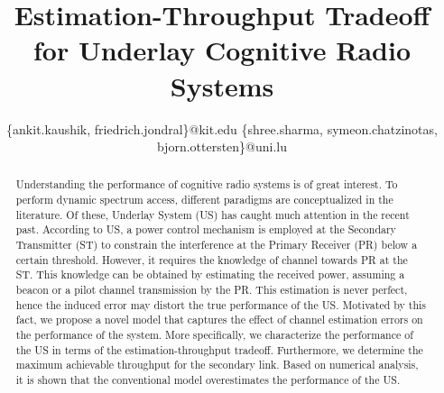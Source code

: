 \documentclass[conference, twocolumn]{IEEEtran}
\newcommand{\imp}{\uline}
\newcommand{\ur}{\uuline}
\newcommand{\ns}{\uwave}
\newcommand{\ws}{\sout}
\newcommand{\fl}{\dashuline}
\newcommand{\un}{\dotuline}
\begin{document}
%
\title{Estimation-Throughput Tradeoff for Underlay Cognitive Radio Systems}
\author{
\{ankit.kaushik, friedrich.jondral\}@kit.edu
\{shree.sharma, symeon.chatzinotas, bjorn.ottersten\}@uni.lu
}

\maketitle
\thispagestyle{empty}
\pagestyle{empty}

\begin{abstract}
Understanding the performance of cognitive radio systems is of great interest. To perform dynamic spectrum access, different paradigms are conceptualized in the literature. Of these, Underlay System (US) has caught much attention in the recent past. According to US, a power control mechanism is employed at the Secondary Transmitter (ST) to constrain the interference at the Primary Receiver (PR) below a certain threshold. However, it requires the knowledge of channel towards PR at the ST. This knowledge can be obtained by estimating the received power, assuming a beacon or a pilot channel transmission by the PR. This estimation is never perfect, hence the induced error may distort the true performance of the US. Motivated by this fact, we propose a novel model that captures the effect of channel estimation errors on the performance of the system. More specifically, we characterize the performance of the US in terms of the estimation-throughput tradeoff.
Furthermore, we determine the maximum achievable throughput for the secondary link. Based on numerical analysis, it is shown that the conventional model overestimates the performance of the US.
\end{abstract}
\end{document}

